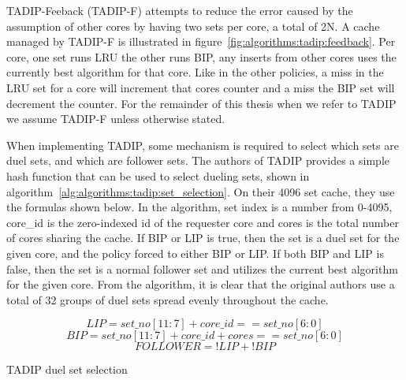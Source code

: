 TADIP-Feeback (TADIP-F) attempts to reduce the error caused by the assumption of other cores by having two sets per core, a total of 2N.
A cache managed by TADIP-F is illustrated in figure~\ref{fig:algorithms:tadip:feedback}.
Per core, one set runs LRU the other runs BIP, any inserts from other cores uses the currently best algorithm for that core.
Like in the other policies, a miss in the LRU set for a core will increment that cores counter and a miss the BIP set will decrement the counter.
For the remainder of this thesis when we refer to TADIP we assume TADIP-F unless otherwise stated.

When implementing TADIP, some mechanism is required to select which sets are duel sets, and which are follower sets.
The authors of TADIP provides a simple hash function that can be used to select dueling sets, shown in algorithm~\ref{alg:algorithms:tadip:set_selection}.
On their 4096 set cache, they use the formulas shown below.
In the algorithm, set index is a number from 0-4095, core\_id is the zero-indexed id of the requester core and cores is the total number of cores sharing the cache.
If BIP or LIP is true, then the set is a duel set for the given core, and the policy forced to either BIP or LIP.
If both BIP and LIP is false, then the set is a normal follower set and utilizes the current best algorithm for the given core.
From the algorithm, it is clear that the original authors use a total of 32 groups of duel sets spread evenly throughout the cache.
\begin{algorithm}[ht]
\begin{equation}
LIP = set\_no[11:7] + core\_id == set\_no[6:0]
\end{equation}
\begin{equation}
BIP = set\_no[11:7] + core\_id + cores == set\_no[6:0]
\end{equation}
\begin{equation}
FOLLOWER = !LIP + !BIP
\end{equation}
\label{alg:algorithms:tadip:set_selection}
\caption{TADIP duel set selection}
\end{algorithm}
